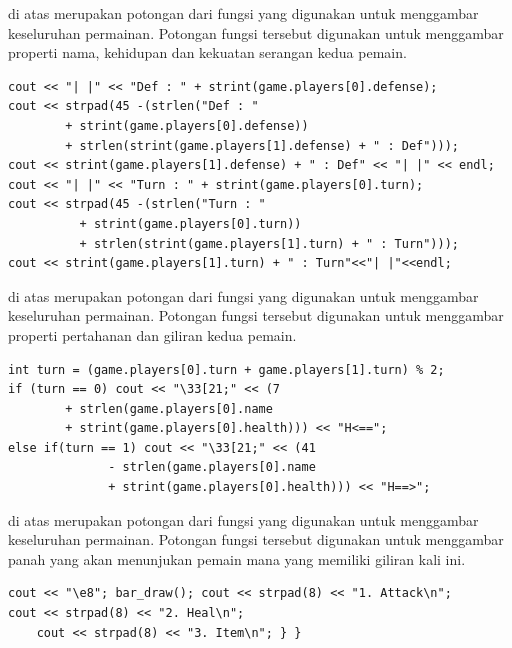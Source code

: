 \documentclass[../main.tex]{subfiles}
\begin{document}
{\Script} di atas merupakan potongan dari fungsi  yang digunakan untuk menggambar keseluruhan permainan. Potongan fungsi tersebut digunakan untuk menggambar properti nama, kehidupan dan kekuatan serangan kedua pemain.

\begin{code}
\begin{verbatim}
cout << "| |" << "Def : " + strint(game.players[0].defense);
cout << strpad(45 -(strlen("Def : "
        + strint(game.players[0].defense))
        + strlen(strint(game.players[1].defense) + " : Def")));
cout << strint(game.players[1].defense) + " : Def" << "| |" << endl;
cout << "| |" << "Turn : " + strint(game.players[0].turn);
cout << strpad(45 -(strlen("Turn : "
          + strint(game.players[0].turn))
          + strlen(strint(game.players[1].turn) + " : Turn")));
cout << strint(game.players[1].turn) + " : Turn"<<"| |"<<endl;
\end{verbatim}
\end{code}

{\Script} di atas merupakan potongan dari fungsi  yang digunakan untuk menggambar keseluruhan permainan. Potongan fungsi tersebut digunakan untuk menggambar properti pertahanan dan giliran kedua pemain.

\begin{code}
\begin{verbatim}
int turn = (game.players[0].turn + game.players[1].turn) % 2;
if (turn == 0) cout << "\33[21;" << (7
        + strlen(game.players[0].name
        + strint(game.players[0].health))) << "H<==";
else if(turn == 1) cout << "\33[21;" << (41
              - strlen(game.players[0].name
              + strint(game.players[0].health))) << "H==>";
\end{verbatim}
\end{code}

{\Script} di atas merupakan potongan dari fungsi  yang digunakan untuk menggambar keseluruhan permainan. Potongan fungsi tersebut digunakan untuk menggambar panah yang akan menunjukan pemain mana yang memiliki giliran kali ini.

\begin{code}
\begin{verbatim}
cout << "\e8"; bar_draw(); cout << strpad(8) << "1. Attack\n";
cout << strpad(8) << "2. Heal\n";
    cout << strpad(8) << "3. Item\n"; } }
\end{verbatim}
\end{code}
\end{document}

